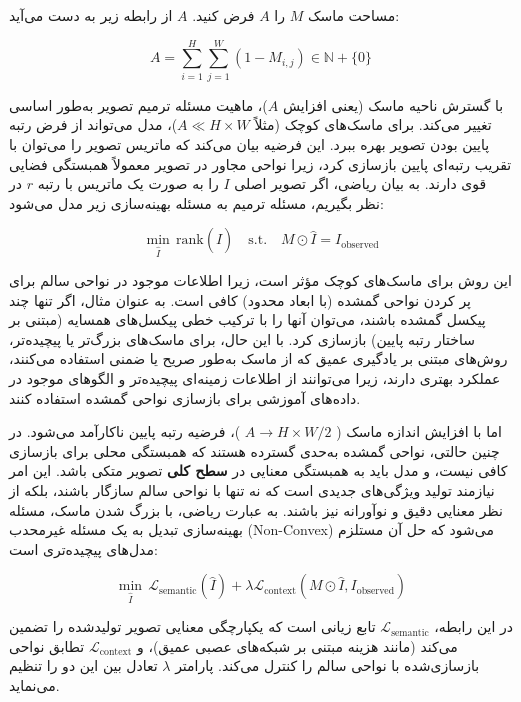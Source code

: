 مساحت ماسک $M$ را $A$ فرض کنید. $A$ از رابطه زیر به دست می‌آید:

$$
A = \sum_{i=1}^{H} \sum_{j=1}^{W} (1 - M_{i,j}) \in \mathbb{N} + \{0\}
$$

با گسترش ناحیه ماسک (یعنی افزایش $A$)، ماهیت مسئله ترمیم تصویر به‌طور اساسی تغییر می‌کند. برای ماسک‌های کوچک (مثلاً \(A \ll H \times W\))، مدل می‌تواند از فرض رتبه پایین بودن تصویر  بهره ببرد. این فرضیه بیان می‌کند که ماتریس تصویر را می‌توان با تقریب رتبه‌ای پایین  بازسازی کرد، زیرا نواحی مجاور در تصویر معمولاً همبستگی فضایی قوی دارند. به بیان ریاضی، اگر تصویر اصلی \(I\) را به صورت یک ماتریس با رتبه \(r\) در نظر بگیریم، مسئله ترمیم به مسئله بهینه‌سازی زیر مدل می‌شود:

\[
\min_{\hat{I}} \, \text{rank}(\hat{I}) \quad \text{s.t.} \quad M \odot \hat{I} = I_{\text{observed}}
\]

این روش برای ماسک‌های کوچک مؤثر است، زیرا اطلاعات موجود در نواحی سالم برای پر کردن نواحی گمشده (با ابعاد محدود) کافی است. به عنوان مثال، اگر تنها چند پیکسل گمشده باشند، می‌توان آنها را با ترکیب خطی پیکسل‌های همسایه (مبتنی بر ساختار رتبه پایین) بازسازی کرد. با این حال، برای ماسک‌های بزرگ‌تر یا پیچیده‌تر، روش‌های مبتنی بر یادگیری عمیق که از ماسک به‌طور صریح یا ضمنی استفاده می‌کنند، عملکرد بهتری دارند، زیرا می‌توانند از اطلاعات زمینه‌ای پیچیده‌تر و الگوهای موجود در داده‌های آموزشی برای بازسازی نواحی گمشده استفاده کنند.

اما با افزایش اندازه ماسک (
$A \rightarrow H \times W/2$
)، فرضیه رتبه پایین ناکارآمد می‌شود. در چنین حالتی، نواحی گمشده به‌حدی گسترده هستند که همبستگی محلی برای بازسازی کافی نیست، و مدل باید به همبستگی معنایی%
در \textbf{سطح کلی} تصویر متکی باشد. این امر نیازمند تولید ویژگی‌های جدیدی است که نه تنها با نواحی سالم سازگار باشند، بلکه از نظر معنایی دقیق و نوآورانه نیز باشند. به عبارت ریاضی، با بزرگ شدن ماسک، مسئله بهینه‌سازی تبدیل به یک مسئله غیرمحدب (Non-Convex) می‌شود که حل آن مستلزم مدل‌های پیچیده‌تری است:

$$
\min_{\hat{I}} \, \mathcal{L}_{\text{semantic}}(\hat{I}) + \lambda \mathcal{L}_{\text{context}}(M \odot \hat{I}, I_{\text{observed}})
$$

در این رابطه، $\mathcal{L}_{\text{semantic}}$ تابع زیانی است که یکپارچگی معنایی تصویر تولیدشده را تضمین می‌کند (مانند هزینه مبتنی بر شبکه‌های عصبی عمیق)، و $\mathcal{L}_{\text{context}}$ تطابق نواحی بازسازی‌شده با نواحی سالم را کنترل می‌کند. پارامتر $\lambda$ تعادل بین این دو را تنظیم می‌نماید.


